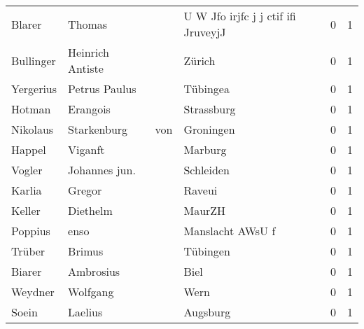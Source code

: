 \begin{center}
\begin{tiny}
\begin{longtabu}{llllrr}
                   Blarer &                             Thomas &             &         U W Jfo irjfc j j ctif ifi JruveyjJ &          0 &         1 \\
                Bullinger &                   Heinrich Antiste &             &                                      Zürich &          0 &         1 \\
                Yergerius &                      Petrus Paulus &             &                                    Tübingea &          0 &         1 \\
                   Hotman &                           Erangois &             &                                  Strassburg &          0 &         1 \\
                 Nikolaus &                        Starkenburg &         von &                                   Groningen &          0 &         1 \\
                   Happel &                            Viganft &             &                                     Marburg &          0 &         1 \\
                   Vogler &                      Johannes jun. &             &                                   Schleiden &          0 &         1 \\
                   Karlia &                             Gregor &             &                                      Raveui &          0 &         1 \\
                   Keller &                           Diethelm &             &                                      MaurZH &          0 &         1 \\
                  Poppius &                               enso &             &                            Manslacht AWsU f &          0 &         1 \\
                   Trüber &                             Brimus &             &                                    Tübingen &          0 &         1 \\
                   Biarer &                          Ambrosius &             &                                        Biel &          0 &         1 \\
                  Weydner &                           Wolfgang &             &                                        Wern &          0 &         1 \\
                    Soein &                            Laelius &             &                                    Augsburg &          0 &         1 \\

\end{longtabu}
\end{tiny}
\end{center}
